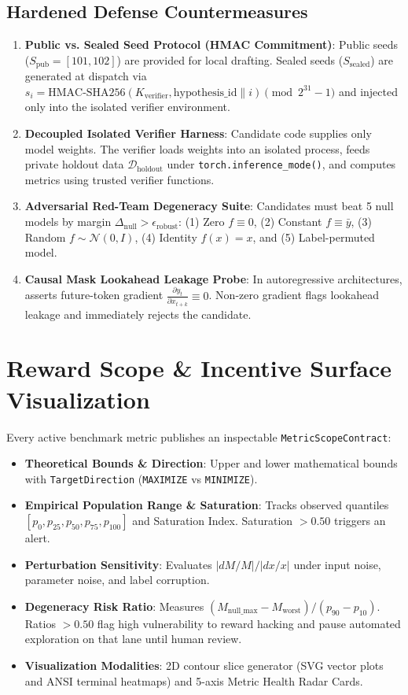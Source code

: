 \documentclass[11pt,a4paper]{article}
\begin{document}
\subsection{Hardened Defense Countermeasures}
\begin{enumerate}[noitemsep]
    \item \textbf{Public vs. Sealed Seed Protocol (HMAC Commitment)}: Public seeds ($S_{\text{pub}} = [101, 102]$) are provided for local drafting. Sealed seeds ($S_{\text{sealed}}$) are generated at dispatch via $s_i = \text{HMAC-SHA256}(K_{\text{verifier}}, \text{hypothesis\_id} \parallel i) \pmod{2^{31} - 1}$ and injected only into the isolated verifier environment.
    \item \textbf{Decoupled Isolated Verifier Harness}: Candidate code supplies only model weights. The verifier loads weights into an isolated process, feeds private holdout data $\mathcal{D}_{\text{holdout}}$ under \texttt{torch.inference\_mode()}, and computes metrics using trusted verifier functions.
    \item \textbf{Adversarial Red-Team Degeneracy Suite}: Candidates must beat 5 null models by margin $\Delta_{\text{null}} > \epsilon_{\text{robust}}$: (1) Zero $f \equiv 0$, (2) Constant $f \equiv \bar{y}$, (3) Random $f \sim \mathcal{N}(0, I)$, (4) Identity $f(x) = x$, and (5) Label-permuted model.
    \item \textbf{Causal Mask Lookahead Leakage Probe}: In autoregressive architectures, asserts future-token gradient $\frac{\partial y_t}{\partial x_{t+k}} \equiv 0$. Non-zero gradient flags lookahead leakage and immediately rejects the candidate.
\end{enumerate}

\section{Reward Scope \& Incentive Surface Visualization}

Every active benchmark metric publishes an inspectable \texttt{MetricScopeContract}:
\begin{itemize}[noitemsep]
    \item \textbf{Theoretical Bounds \& Direction}: Upper and lower mathematical bounds with \texttt{TargetDirection} (\texttt{MAXIMIZE} vs \texttt{MINIMIZE}).
    \item \textbf{Empirical Population Range \& Saturation}: Tracks observed quantiles $[p_0, p_{25}, p_{50}, p_{75}, p_{100}]$ and Saturation Index. Saturation $> 0.50$ triggers an alert.
    \item \textbf{Perturbation Sensitivity}: Evaluates $|dM/M| / |dx/x|$ under input noise, parameter noise, and label corruption.
    \item \textbf{Degeneracy Risk Ratio}: Measures $(M_{\text{null\_max}} - M_{\text{worst}}) / (p_{90} - p_{10})$. Ratios $> 0.50$ flag high vulnerability to reward hacking and pause automated exploration on that lane until human review.
    \item \textbf{Visualization Modalities}: 2D contour slice generator (SVG vector plots and ANSI terminal heatmaps) and 5-axis Metric Health Radar Cards.
\end{itemize}
\end{document}
